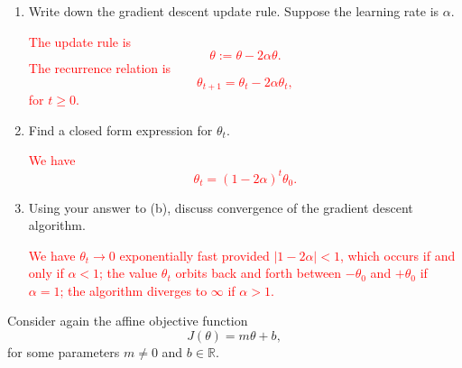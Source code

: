 \documentclass[12pt,reqno]{amsart}
\begin{document}
\begin{enumerate}
\item Write down the gradient descent update rule. Suppose the learning rate is $\alpha$.

\bigskip
\textcolor{red}{The update rule is
	\[\theta := \theta - 2\alpha \theta.
	\]
The recurrence relation is
	\[\theta_{t+1} = \theta_{t} - 2\alpha\theta_{t},
	\]
for $t\geq 0$.}
\bigskip

\item Find a closed form expression for $\theta_t$.

\bigskip
\textcolor{red}{We have
	\[\theta_t = (1-2\alpha)^t \theta_0.
	\]}
\bigskip

\item Using your answer to (b), discuss convergence of the gradient descent algorithm.

\bigskip
\textcolor{red}{We have $\theta_t \to 0$ exponentially fast provided $|1-2\alpha|<1$, which occurs if and only if $\alpha < 1$; the value $\theta_t$ orbits back and forth between $-\theta_0$ and $+\theta_0$ if $\alpha =1$; the algorithm diverges to $\infty$ if $\alpha>1$.}
\bigskip
\end{enumerate}










\prob Consider again the affine objective function
	\[J(\theta) = m\theta + b,
	\]
for some parameters $m\neq 0$ and $b\in \mathbb{R}$.
\end{document}
